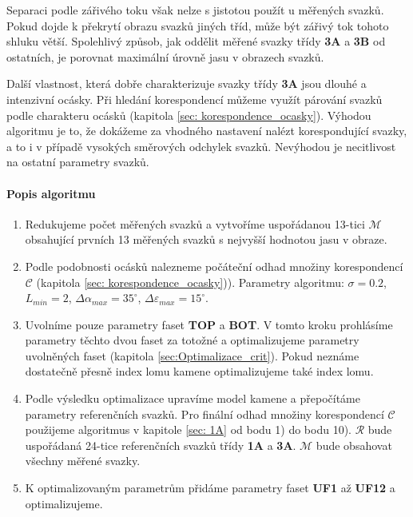 	Separaci podle zářivého toku  však nelze s jistotou použít u měřených svazků. Pokud dojde k překrytí obrazu svazků jiných tříd, může být zářivý tok tohoto shluku větší. Spolehlivý způsob, jak oddělit měřené svazky třídy \textbf{3A} a \textbf{3B} od ostatních, je porovnat maximální úrovně jasu v obrazech svazků.  
	
	Další vlastnost, která dobře charakterizuje svazky třídy \textbf{3A} jsou dlouhé a intenzivní ocásky. Při hledání korespondencí můžeme využít párování svazků podle charakteru ocásků (kapitola \ref{sec: korespondence_ocasky}). Výhodou algoritmu je to, že dokážeme za vhodného nastavení nalézt korespondující svazky, a to i v případě vysokých směrových odchylek svazků. Nevýhodou je necitlivost na ostatní parametry svazků. 

\paragraph{Popis algoritmu} 

\begin{enumerate}
	\item Redukujeme počet měřených svazků a vytvoříme uspořádanou 13-tici $\mathcal{M}$ obsahující prvních 13 měřených svazků s nejvyšší hodnotou jasu v obraze. 

	\item Podle podobnosti ocásků nalezneme počáteční odhad množiny korespondencí $\mathcal{C}$ (kapitola \ref{sec: korespondence_ocasky})). Parametry algoritmu: $\sigma = 0.2$, $L_{min} = 2$, $\Delta\alpha_{max} = 35^\circ$, $\Delta\varepsilon_{max} = 15^\circ$.
	
	\item Uvolníme pouze parametry faset \textbf{TOP} a \textbf{BOT}. V tomto kroku prohlásíme parametry těchto dvou faset za totožné a optimalizujeme parametry uvolněných faset (kapitola \ref{sec:Optimalizace_crit}). Pokud neznáme dostatečně přesně index lomu kamene optimalizujeme také index lomu. 
	
	\item Podle výsledku optimalizace upravíme model kamene a přepočítáme parametry referenčních svazků. Pro finální odhad množiny korespondencí $\mathcal{C}$ použijeme algoritmus v kapitole \ref{sec: 1A} od bodu 1) do bodu 10). $\mathcal{R}$ bude uspořádaná 24-tice referenčních svazků třídy \textbf{1A} a \textbf{3A}. $\mathcal{M}$ bude obsahovat všechny měřené svazky.  
	
	\item K optimalizovaným parametrům přidáme parametry faset \textbf{UF1} až \textbf{UF12} a optimalizujeme. 
		
\end{enumerate}

